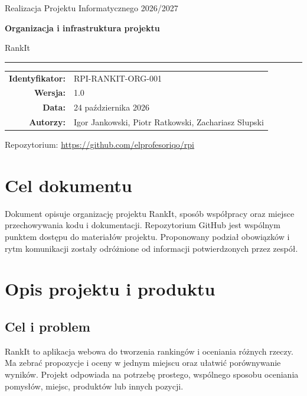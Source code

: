 \documentclass[11pt,a4paper]{article}
\begin{document}
\begin{titlepage}
  \centering
  \vspace*{2.2cm}
  {\Huge\RankItWordmark\par}
  \vspace{0.7cm}
  {\Large Realizacja Projektu Informatycznego 2026/2027\par}
  \vspace{1.7cm}
  {\huge\bfseries\color{RankItNavy}Organizacja i infrastruktura projektu\par}
  \vspace{0.45cm}
  {\LARGE RankIt\par}
  \vspace{0.8cm}
  {\color{RankItTeal}\rule{0.72\textwidth}{1.5pt}\par}
  \vspace{1.3cm}
  \begin{tabular}{rl}
    \textbf{Identyfikator:} & RPI-RANKIT-ORG-001 \\
    \textbf{Wersja:} & 1.0 \\
    \textbf{Data:} & 24 października 2026 \\
    \textbf{Autorzy:} & Igor Jankowski, Piotr Ratkowski, Zachariasz Słupski \\
  \end{tabular}
  \vfill
  {\large\textcolor{RankItNavy}{Repozytorium:} \url{https://github.com/elprofesoriqo/rpi}\par}
\end{titlepage}

\tableofcontents
\clearpage
{}
\setcounter{page}{2}

\section*{Cel dokumentu}
Dokument opisuje organizację projektu RankIt, sposób współpracy oraz miejsce przechowywania kodu i dokumentacji. Repozytorium GitHub jest wspólnym punktem dostępu do materiałów projektu. Proponowany podział obowiązków i rytm komunikacji zostały odróżnione od informacji potwierdzonych przez zespół.

\section{Opis projektu i produktu}
\subsection{Cel i problem}
RankIt to aplikacja webowa do tworzenia rankingów i oceniania różnych rzeczy. Ma zebrać propozycje i oceny w jednym miejscu oraz ułatwić porównywanie wyników. Projekt odpowiada na potrzebę prostego, wspólnego sposobu oceniania pomysłów, miejsc, produktów lub innych pozycji.
\end{document}
